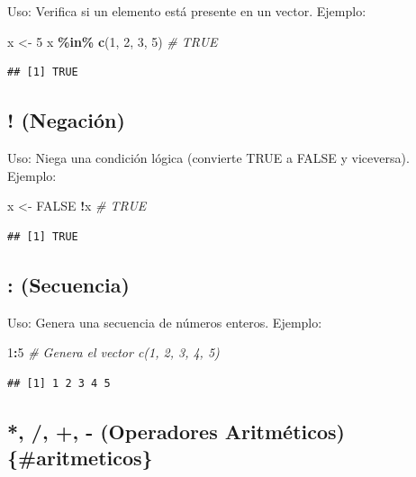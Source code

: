 \documentclass[
]{book}
\newenvironment{Shaded}{\begin{snugshade}}{\end{snugshade}}
\newcommand{\CommentTok}[1]{\textcolor[rgb]{0.56,0.35,0.01}{\textit{#1}}}
\newcommand{\ConstantTok}[1]{\textcolor[rgb]{0.56,0.35,0.01}{#1}}
\newcommand{\DecValTok}[1]{\textcolor[rgb]{0.00,0.00,0.81}{#1}}
\newcommand{\FunctionTok}[1]{\textcolor[rgb]{0.13,0.29,0.53}{\textbf{#1}}}
\newcommand{\NormalTok}[1]{#1}
\newcommand{\OtherTok}[1]{\textcolor[rgb]{0.56,0.35,0.01}{#1}}
\newcommand{\SpecialCharTok}[1]{\textcolor[rgb]{0.81,0.36,0.00}{\textbf{#1}}}
\begin{document}
Uso: Verifica si un elemento está presente en un vector.
Ejemplo:

\begin{Shaded}
\begin{Highlighting}[]
\NormalTok{x }\OtherTok{\textless{}{-}} \DecValTok{5}
\NormalTok{x }\SpecialCharTok{\%in\%} \FunctionTok{c}\NormalTok{(}\DecValTok{1}\NormalTok{, }\DecValTok{2}\NormalTok{, }\DecValTok{3}\NormalTok{, }\DecValTok{5}\NormalTok{)  }\CommentTok{\# TRUE}
\end{Highlighting}
\end{Shaded}

\begin{verbatim}
## [1] TRUE
\end{verbatim}

\subsection{! (Negación)}\label{negaciuxf3n}

Uso: Niega una condición lógica (convierte TRUE a FALSE y viceversa).
Ejemplo:

\begin{Shaded}
\begin{Highlighting}[]
\NormalTok{x }\OtherTok{\textless{}{-}} \ConstantTok{FALSE}
\SpecialCharTok{!}\NormalTok{x  }\CommentTok{\# TRUE}
\end{Highlighting}
\end{Shaded}

\begin{verbatim}
## [1] TRUE
\end{verbatim}

\subsection{: (Secuencia)}\label{secuencia}

Uso: Genera una secuencia de números enteros.
Ejemplo:

\begin{Shaded}
\begin{Highlighting}[]
\DecValTok{1}\SpecialCharTok{:}\DecValTok{5}  \CommentTok{\# Genera el vector c(1, 2, 3, 4, 5)}
\end{Highlighting}
\end{Shaded}

\begin{verbatim}
## [1] 1 2 3 4 5
\end{verbatim}

\subsection{*, /, +, - (Operadores Aritméticos) \{\#aritmeticos\}}\label{operadores-aritmuxe9ticos-aritmeticos}
\end{document}
